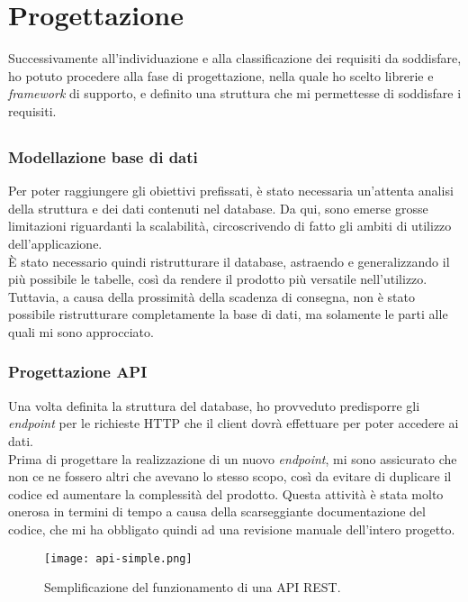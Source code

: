 \section{Progettazione}
Successivamente all'individuazione e alla classificazione dei requisiti da soddisfare, ho potuto procedere alla fase di progettazione, nella quale ho scelto librerie e \textit{framework} di supporto, e definito una struttura che mi permettesse di soddisfare i requisiti.
\subsection{\DS}
\subsubsection{Modellazione base di dati}
Per poter raggiungere gli obiettivi prefissati, è stato necessaria un'attenta analisi della struttura e dei dati contenuti nel database. Da qui, sono emerse grosse limitazioni riguardanti la scalabilità, circoscrivendo di fatto gli ambiti di utilizzo dell'applicazione.\\
\`E stato necessario quindi ristrutturare il database, astraendo e generalizzando il più possibile le tabelle, così da rendere il prodotto più versatile nell'utilizzo. Tuttavia, a causa della prossimità della scadenza di consegna, non è stato possibile ristrutturare completamente la base di dati, ma solamente le parti alle quali mi sono approcciato.   
\subsubsection{Progettazione API}
Una volta definita la struttura del database, ho provveduto predisporre gli \textit{endpoint} per le richieste HTTP che il client dovrà effettuare per poter accedere ai dati.\\
Prima di progettare la realizzazione di un nuovo \textit{endpoint}, mi sono assicurato che non ce ne fossero altri che avevano lo stesso scopo, così da evitare di duplicare il codice ed aumentare la complessità del prodotto. Questa attività è stata molto onerosa in termini di tempo a causa della scarseggiante documentazione del codice, che mi ha obbligato quindi ad una revisione manuale dell'intero progetto.
\begin{figure}[h]
\texttt{[image: api-simple.png]}
\centering
\caption{Semplificazione del funzionamento di una API REST.} 
\label{fig:api-simple}
\end{figure}
